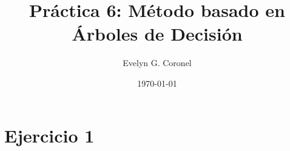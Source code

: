 
\usepackage{multirow}


\title{Práctica 6: Método basado en Árboles de Decisión}
\author{Evelyn G. Coronel}


\date[]{\lowercase{\today}} 

\maketitle

\section*{Ejercicio 1}










